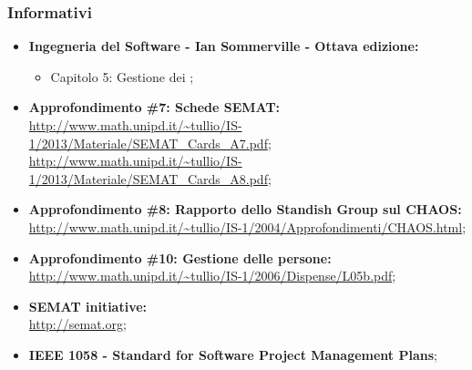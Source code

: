 \subsubsection{Informativi} \label{informativi}
\begin{itemize}
\item \textbf{Ingegneria del Software - Ian Sommerville - Ottava edizione:}
\begin{itemize}
\item Capitolo 5: Gestione dei ;
\end{itemize}
\item \textbf{Approfondimento \#7: Schede SEMAT:} \\
\url{http://www.math.unipd.it/~tullio/IS-1/2013/Materiale/SEMAT_Cards_A7.pdf}; \\
\url{http://www.math.unipd.it/~tullio/IS-1/2013/Materiale/SEMAT_Cards_A8.pdf};
\item \textbf{Approfondimento \#8: Rapporto dello Standish Group sul  CHAOS:} \\
\url{http://www.math.unipd.it/~tullio/IS-1/2004/Approfondimenti/CHAOS.html};
\item \textbf{Approfondimento \#10: Gestione delle persone:} \\
\url{http://www.math.unipd.it/~tullio/IS-1/2006/Dispense/L05b.pdf};
\item \textbf{SEMAT initiative:} \\
\url{http://semat.org};
\item \textbf{IEEE 1058 - Standard for Software Project Management Plans};
\end{itemize}
